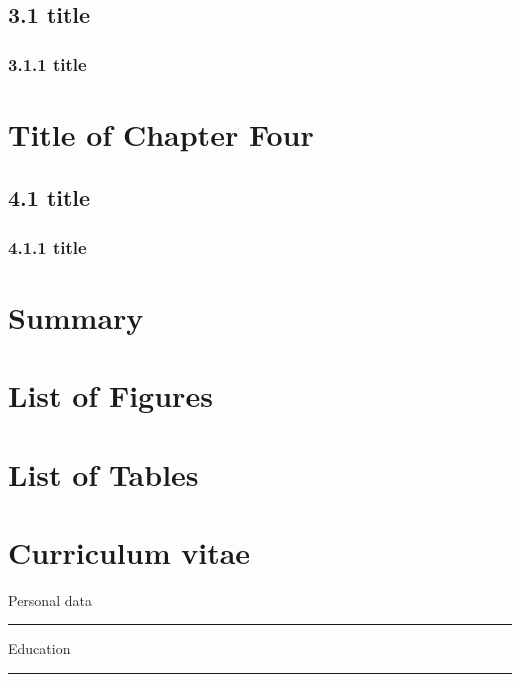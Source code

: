 \documentclass[a4paper,12pt,UTF8,openright]{book}
\begin{document}
\section{3.1 title}
\lipsum[1-5]

\subsection{3.1.1 title}
\lipsum[1-5]

\chapter{Title of Chapter Four}
\lipsum[1-5]

\section{4.1 title}
\lipsum[1-5]

\subsection{4.1.1 title}
\lipsum[1-5]

\chapter{Summary}
\lipsum[1-5]

{}


\chapter*{List of Figures}

\chapter*{List of Tables}

\chapter*{Curriculum vitae}

\noindent Personal data \\
\noindent\rule{\textwidth}{0.4pt}

\noindent Education \\
\noindent\rule{\textwidth}{0.4pt}
\end{document}
